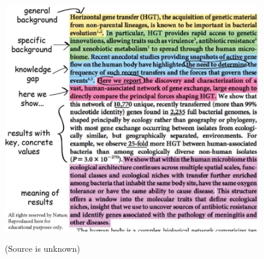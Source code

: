 \begin{figure}[ht]
\includegraphics[scale=.4]{pictures/the_perfect_abstract.jpg}
\label{fig:abstract}
\caption{(Source is unknown)}
\end{figure}
